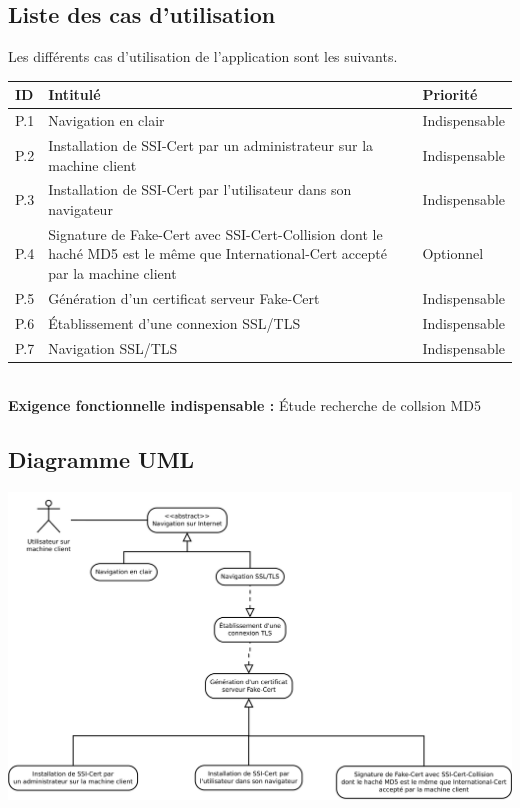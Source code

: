 \documentclass[a4paper,11pt,french]{article}
\begin{document}
\subsection{Liste des cas d'utilisation}

Les différents cas d'utilisation de l'application sont les suivants.

\begin{center}
\begin{tabular}{|l|m{12cm}|l|}
\hline 
\rowcolor[gray]{.8} ID & Intitulé & Priorité \\ 
\hline
P.1 & Navigation en clair & Indispensable\\
\hline
P.2 & Installation de SSI-Cert par un administrateur sur la machine client  & Indispensable \\ 
 \hline 
P.3 & Installation de SSI-Cert par l'utilisateur dans son navigateur
 & Indispensable \\ 
\hline 
P.4 & Signature de Fake-Cert avec SSI-Cert-Collision dont le haché MD5 est le même que International-Cert accepté par la machine client & Optionnel \\
\hline
P.5 & Génération d'un certificat serveur Fake-Cert & Indispensable \\ 
\hline
P.6 & Établissement d'une connexion SSL/TLS & Indispensable \\
\hline
P.7 & Navigation SSL/TLS & Indispensable \\ 
\hline

 

\end{tabular} 
\end{center}
~~\\
\textbf{Exigence fonctionnelle indispensable :} Étude recherche de collsion MD5
~~\\

\huge
\subsection{Diagramme UML}
\begin{center}
\includegraphics[width=\textwidth]{images/cas_utilisation.pdf}
\end{center}
\normalsize
\end{document}
